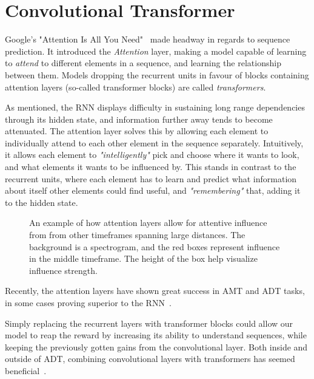 \section{Convolutional Transformer}

Google's "Attention Is All You Need"~\cite{NIPS2017_3f5ee243} made headway in regards to sequence prediction. It introduced the \textit{Attention} layer, making a model capable of learning to \textit{attend} to different elements in a sequence, and learning the relationship between them. Models dropping the recurrent units in favour of blocks containing attention layers (so-called transformer blocks) are called \textit{transformers}.

As mentioned, the \gls{RNN} displays difficulty in sustaining long range dependencies through its hidden state, and information further away tends to become attenuated. The attention layer solves this by allowing each element to individually attend to each other element in the sequence separately. Intuitively, it allows each element to \textit{"intelligently"} pick and choose where it wants to look, and what elements it wants to be influenced by. This stands in contrast to the recurrent units, where each element has to learn and predict what information about itself other elements could find useful, and \textit{"remembering"} that, adding it to the hidden state.

\begin{figure}[H]
    \centering
    
    \caption{An example of how attention layers allow for attentive influence from from other timeframes spanning large distances. The background is a spectrogram, and the red boxes represent influence in the middle timeframe. The height of the box help visualize influence strength.}
    \label{CTInfluenceFigure}
\end{figure}


Recently, the attention layers have shown great success in \gls{AMT} and \gls{ADT} tasks, in some cases proving superior to the \gls{RNN}~\cite{gardner2022mt3multitaskmultitrackmusic, chang2024yourmt3+, zehren2024analyzingreducingsynthetictorealtransfer}.

Simply replacing the recurrent layers with transformer blocks could allow our model to reap the reward by increasing its ability to understand sequences, while keeping the previously gotten gains from the convolutional layer. Both inside and outside of \gls{ADT}, combining convolutional layers with transformers has seemed beneficial~\cite{zehren2024analyzingreducingsynthetictorealtransfer, gulati2020conformerconvolutionaugmentedtransformerspeech}.


